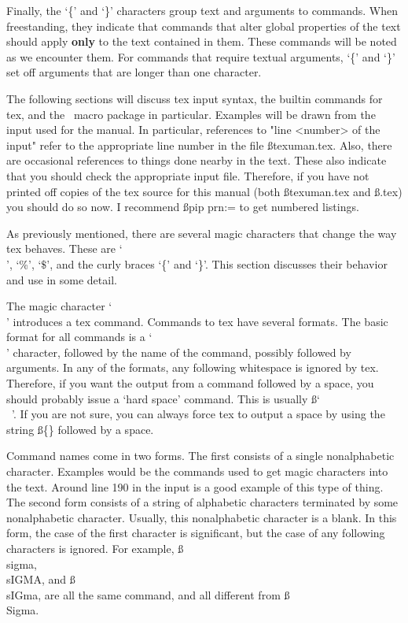 Finally, the `\{' and `\}' characters group text and arguments to
commands. When freestanding, they indicate that commands that
alter global properties of the text should apply {\bf only} to
the text contained in them. These commands will be noted as we
encounter them. For commands that require textual arguments, `\{'
and `\}' set off arguments that are longer than one character.

The following sections will discuss tex input syntax, the builtin
commands for tex, and the \macname\ macro package in particular.
Examples will be drawn from the input used for the manual. In
particular, references to "line <number> of the input" refer to
the appropriate line number in the file {\ss texuman.tex.} Also,
there are occasional references to things done nearby in the
text. These also indicate that you should check the appropriate
input file. Therefore, if you have not printed off copies of the
tex source for this manual (both {\ss texuman.tex} and
{\ss\macname.tex}) you should do so now. I recommend {\ss pip
prn:=} to get numbered listings.


As previously mentioned, there are several magic characters that
change the way tex behaves. These are `\\', `\%', `$\$$', and the
curly braces `\{' and `\}'. This section discusses their
behavior and use in some detail.


The magic character `\\' introduces a tex command. Commands to
tex have several formats. The basic format for all commands is a
`\\' character, followed by the name of the command, possibly
followed by arguments. In any of the formats, any following
whitespace is ignored by tex. Therefore, if you want the output
from a command followed by a space, you should probably issue a
`hard space' command. This is usually {\ss`\\\ '.} If you are not
sure, you can always force tex to output a space by using the
string {\ss \{\}} followed by a space.

Command names come in two forms. The first consists of a single
nonalphabetic character. Examples would be the commands used to
get magic characters into the text. Around line 190 in the input
is a good example of this type of thing. The second form consists
of a string of alphabetic characters terminated by some
nonalphabetic character. Usually, this nonalphabetic character is
a blank. In this form, the case of the first character is
significant, but the case of any following characters is ignored.
For example, {\ss \\sigma, \\sIGMA,} and {\ss \\sIGma,} are all
the same command, and all different from {\ss \\Sigma.}

